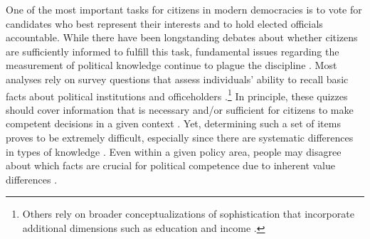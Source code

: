 

One of the most important tasks for citizens in modern democracies is to vote for candidates who best represent their interests and to hold elected officials accountable. While there have been longstanding debates about whether citizens are sufficiently informed to fulfill this task, fundamental issues regarding the measurement of political knowledge continue to plague the discipline \citep{mondak2001developing,sturgis2008experiment,pietryka2013analysis}. Most analyses rely on survey questions that assess individuals' ability to recall basic facts about political institutions and officeholders \citep[e.g.,][]{zaller1990political,carpini1996americans}.\footnote{Others rely on broader conceptualizations of sophistication that incorporate additional dimensions such as education and income \citep[e.g.,][]{jacoby2006value}.} In principle, these quizzes should cover information that is necessary and/or sufficient for citizens to make competent decisions in a given context \citep{lupia2006elitism}. Yet, determining such a set of items proves to be extremely difficult, especially since there are systematic differences in types of knowledge \citep{barabas2014question}. Even within a given policy area, people may disagree about which facts are crucial for political competence due to inherent value differences \citep{lupia2015uninformed}. 

